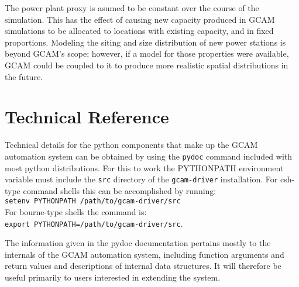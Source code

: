 \documentclass[11pt]{article}
\begin{document}
The power plant proxy is asumed to be constant over the course of the
simulation.  This has the effect of causing new capacity produced in
GCAM simulations to be allocated to locations with existing capacity,
and in fixed proportions.  Modeling the siting and size distribution
of new power stations is beyond GCAM's scope; however, if a model for
those properties were available, GCAM could be coupled to it to
produce more realistic spatial distributions in the future.

\appendix
\section{Technical Reference}
Technical details for the python components that make up the GCAM
automation system can be obtained by using the \texttt{pydoc} command
included with most python distributions.  For this to work the
PYTHONPATH environment variable must include the \texttt{src}
directory of the \texttt{gcam-driver} installation.  For csh-type
command shells this can be accomplished by running:\\
\texttt{setenv PYTHONPATH /path/to/gcam-driver/src}\\
For bourne-type shells the command is:\\
\texttt{export PYTHONPATH=/path/to/gcam-driver/src}.

The information given in the pydoc documentation pertains mostly to
the internals of the GCAM automation system, including function
arguments and return values and descriptions of internal data
structures.  It will therefore be useful primarily to users interested
in extending the system.
\end{document}
